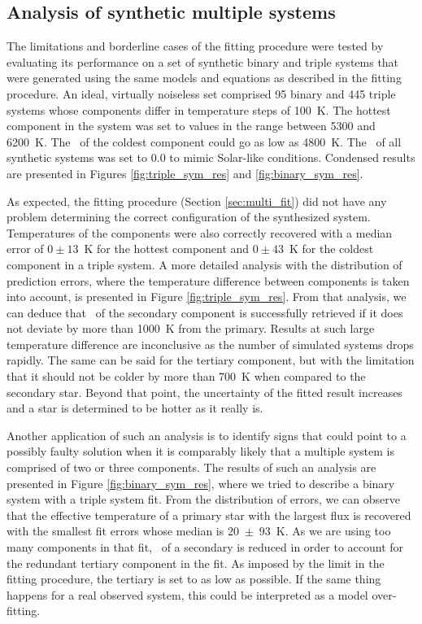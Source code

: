 \subsection{Analysis of synthetic multiple systems}
The limitations and borderline cases of the fitting procedure were tested by evaluating its performance on a set of synthetic binary and triple systems that were generated using the same models and equations as described in the fitting procedure. An ideal, virtually noiseless set comprised 95 binary and 445 triple systems whose components differ in temperature steps of 100~K. The hottest component in the system was set to values in the range between 5300 and 6200~K. The \Teff\ of the coldest component could go as low as 4800~K. The \Feh\ of all synthetic systems was set to $0.0$ to mimic Solar-like conditions. Condensed results are presented in Figures \ref{fig:triple_sym_res} and \ref{fig:binary_sym_res}.

As expected, the fitting procedure (Section \ref{sec:multi_fit}) did not have any problem determining the correct configuration of the synthesized system. Temperatures of the components were also correctly recovered with a median error of $0 \pm 13$~K for the hottest component and  $0 \pm 43$~K for the coldest component in a triple system. A more detailed analysis with the distribution of prediction errors, where the temperature difference between components is taken into account, is presented in Figure \ref{fig:triple_sym_res}. From that analysis, we can deduce that \Teff\ of the secondary component is successfully retrieved if it does not deviate by more than 1000~K from the primary. Results at such large temperature difference are inconclusive as the number of simulated systems drops rapidly. The same can be said for the tertiary component, but with the limitation that it should not be colder by more than 700~K when compared to the secondary star. Beyond that point, the uncertainty of the fitted result increases and a star is determined to be hotter as it really is.

Another application of such an analysis is to identify signs that could point to a possibly faulty solution when it is comparably likely that a multiple system is comprised of two or three components. The results of such an analysis are presented in Figure \ref{fig:binary_sym_res}, where we tried to describe a binary system with a triple system fit. From the distribution of errors, we can observe that the effective temperature of a primary star with the largest flux is recovered with the smallest fit errors whose median is $20$~$\pm$~$93$~K. As we are using too many components in that fit, \Teff\ of a secondary is reduced in order to account for the redundant tertiary component in the fit. As imposed by the limit in the fitting procedure, the tertiary  is set to as low as possible. If the same thing happens for a real observed system, this could be interpreted as a model over-fitting.

